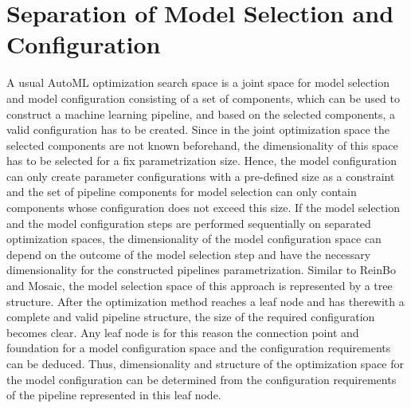 \section{Separation of Model Selection and Configuration}
\label{sec:approach:separation}
A usual AutoML optimization search space is a joint space for model selection and model configuration consisting of a set of components, which can be used to construct a machine learning pipeline, and based on the selected components, a valid configuration has to be created.
Since in the joint optimization space the selected components are not known beforehand, the dimensionality of this space has to be selected for a fix parametrization size.
Hence, the model configuration can only create parameter configurations with a pre-defined size as a constraint and the set of pipeline components for model selection can only contain components whose configuration does not exceed this size.\newline
If the model selection and the model configuration steps are performed sequentially on separated optimization spaces, the dimensionality of the model configuration space can depend on the outcome of the model selection step and have the necessary dimensionality for the constructed pipelines parametrization.\newline
Similar to ReinBo and Mosaic, the model selection space of this approach is represented by a tree structure.
After the optimization method reaches a leaf node and has therewith a complete and valid pipeline structure, the size of the required configuration becomes clear.
Any leaf node is for this reason the connection point and foundation for a model configuration space and the configuration requirements can be deduced.
Thus, dimensionality and structure of the optimization space for the model configuration can be determined from the configuration requirements of the pipeline represented in this leaf node.

